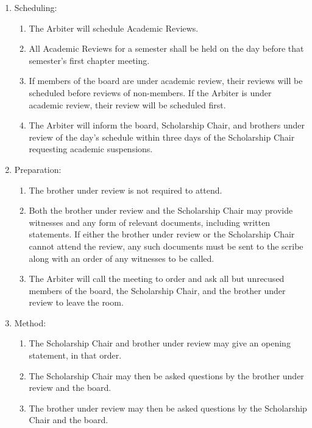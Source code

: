 \begin{enumerate}
			\begin{enumerate}
				\item  Scheduling:
				\begin{enumerate}
					\item The Arbiter will schedule Academic Reviews.
					\item All Academic Reviews for a semester shall be held on the day before that semester’s first chapter meeting.
					\item If members of the board are under academic review, their reviews will be scheduled before reviews of non-members. If the Arbiter is under academic review, their review will be scheduled first.
					\item The Arbiter will inform the board, Scholarship Chair, and brothers under review of the day’s schedule within three days of the Scholarship Chair requesting academic suspensions.
				\end{enumerate}
				\item  Preparation:
				\begin{enumerate}
					\item The brother under review is not required to attend.
					\item Both the brother under review and the Scholarship Chair may provide witnesses and any form of relevant documents, including written statements. If either the brother under review or the Scholarship Chair cannot attend the review, any such documents must be sent to the scribe along with an order of any witnesses to be called.
					\item The Arbiter will call the meeting to order and ask all but unrecused members of the board, the Scholarship Chair, and the brother under review to leave the room.
				\end{enumerate}
				\item Method:
				\begin{enumerate}
					\item The Scholarship Chair and brother under review may give an opening statement, in that order.
					\item The Scholarship Chair may then be asked questions by the brother under review and the board.
					\item The brother under review may then be asked questions by the Scholarship Chair and the board.

\end{enumerate}
\end{enumerate}
\end{enumerate}
